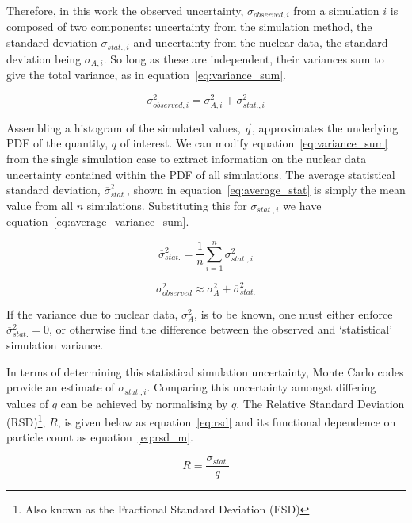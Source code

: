 Therefore, in this work the observed uncertainty, $\sigma_{observed,i}$ from a simulation $i$ is composed of two components: uncertainty from the simulation method, the standard deviation $\sigma_{stat.,i}$ and uncertainty from the nuclear data, the standard deviation being $\sigma_{A,i}$. So long as these are independent, their variances sum to give the total variance, as in equation~\ref{eq:variance_sum}.

\begin{equation}
  \label{eq:variance_sum}
  \sigma_{observed,i}^{2} = \sigma_{A,i}^{2} + \sigma_{stat.,i}^{2}
\end{equation}

Assembling a histogram of the simulated values, $\vec{q}$, approximates the underlying PDF of the quantity, $q$ of interest. We can modify equation~\ref{eq:variance_sum} from the single simulation case to extract information on the nuclear data uncertainty contained within the PDF of all simulations. The average statistical standard deviation, $\overline{\sigma}_{stat.}^{2}$, shown in equation~\ref{eq:average_stat} is simply the mean value from all $n$ simulations. Substituting this for $\sigma_{stat.,i}$ we have equation~\ref{eq:average_variance_sum}. 

\begin{equation}
  \label{eq:average_stat}
  \overline{\sigma}_{stat.}^{2} = \frac{1}{n} \sum^{n}_{i=1}\sigma^{2}_{stat.,i}
\end{equation}

\begin{equation}
  \label{eq:average_variance_sum}
  \sigma_{observed}^{2} \approx \sigma_{A}^{2} + \overline{\sigma}_{stat.}^{2}
\end{equation}

If the variance due to nuclear data, $\sigma_{A}^{2}$, is to be known, one must either enforce $\overline{\sigma}_{stat.}^{2} = 0$, or otherwise find the difference between the observed and `statistical' simulation variance. 

In terms of determining this statistical simulation uncertainty, Monte Carlo codes provide an estimate of $\sigma_{stat.,i}$. Comparing this uncertainty amongst differing values of $q$ can be achieved by normalising by $q$. The Relative Standard Deviation (RSD)\footnote{Also known as the Fractional Standard Deviation (FSD)}, $R$, is given below as equation~\ref{eq:rsd} and its functional dependence on particle count as equation~\ref{eq:rsd_m}.

\begin{equation}
  \label{eq:rsd}
  R = \frac{\sigma_{stat.}}{q}
\end{equation}

